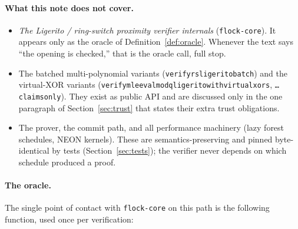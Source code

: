 \documentclass[11pt]{article}
\newcommand{\code}[1]{{\def\_{\textunderscore\allowbreak}\texttt{#1}}}
\begin{document}
\paragraph{What this note does not cover.}
\begin{itemize}[itemsep=1pt]
\item \emph{The Ligerito / ring-switch proximity verifier internals}
  (\code{flock-core}).  It appears only as the oracle of
  Definition~\ref{def:oracle}.  Whenever the text says ``the opening is
  checked,'' that is the oracle call, full stop.
\item The batched multi-polynomial variants
  (\code{verify\_rs\_ligerito\_batch}) and the virtual-XOR variants
  (\code{verify\_mle\_eval\_mod\_q\_ligerito\_with\_virtual\_xors},
  \code{\ldots\_claims\_only}).  They exist as public API and are
  discussed only in the one paragraph of
  Section~\ref{sec:trust} that states their extra trust obligations.
\item The prover, the commit path, and all performance machinery (lazy
  forest schedules, NEON kernels).  These are semantics-preserving and
  pinned byte-identical by tests (Section~\ref{sec:tests}); the verifier
  never depends on which schedule produced a proof.
\end{itemize}

\paragraph{The oracle.}  The single point of contact with
\code{flock-core} on this path is the following function, used once per
verification:
\end{document}
